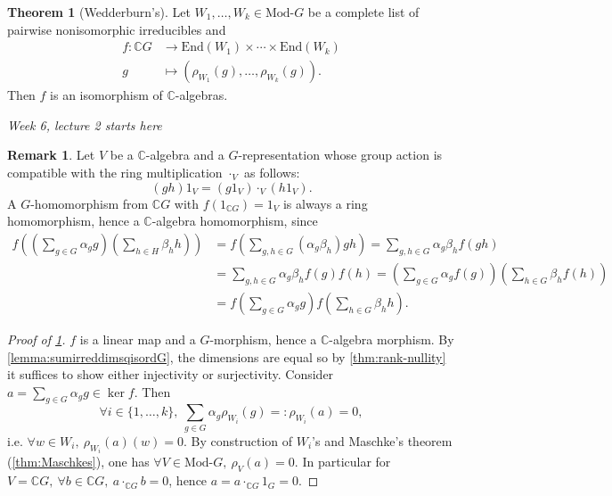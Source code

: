 \documentclass[a4paper]{article}
\newcommand{\C}{\mathbb{C}}
\newcommand{\End}{\text{End}}
\newcommand{\Mod}{\text{Mod-}}
\theoremstyle{definition}
\newtheorem{thm}[defn]{Theorem}
\newtheorem*{remark}{Remark}
\begin{document}
\begin{thm}[Wedderburn's]
\label{thm:Wedderburns}
Let $W_1,\ldots,W_k\in\Mod G$ be a complete list of pairwise nonisomorphic irreducibles and
\[
\begin{aligned}
f:\C G&\rightarrow\End(W_1)\times\cdots\times\End(W_k)\\
g&\mapsto \left(\rho_{W_1}(g),\ldots,\rho_{W_k}(g)\right).
\end{aligned}
\]
Then $f$ is an isomorphism of $\C$-algebras.
\end{thm}

\begin{flushright}
\textit{Week 6, lecture 2 starts here}
\end{flushright}

\begin{remark}
Let $V$ be a $\C$-algebra and a $G$-representation whose group action is compatible with the ring multiplication $\cdot_V$ as follows:
\[
(gh)1_V=(g1_V)\cdot_V(h1_V).
\]
A $G$-homomorphism from $\C G$ with $f(1_{\C G})=1_V$ is always a ring homomorphism, hence a $\C$-algebra homomorphism, since
\[
\begin{aligned}
f\left(\left(\sum_{g\in G}\alpha_g g\right)\left(\sum_{h\in H}\beta_h h\right)\right)&=f\left(\sum_{g,h\in G}(\alpha_g\beta_h)gh\right)=\sum_{g,h\in G}\alpha_g\beta_h f(gh)\\
&=\sum_{g,h\in G}\alpha_g\beta_h f(g)f(h)=\left(\sum_{g\in G}\alpha_g f(g)\right)\left(\sum_{h\in G}\beta_h f(h)\right)\\
&=f\left(\sum_{g\in G}\alpha_g g\right)f\left(\sum_{h\in G}\beta_h h\right).
\end{aligned}
\]
\end{remark}

\begin{proof}[Proof of \ref{thm:Wedderburns}]
$f$ is a linear map and a $G$-morphism, hence a $\C$-algebra morphism. By \ref{lemma:sumirreddimsqisordG}, the dimensions are equal so by \ref{thm:rank-nullity} it suffices to show either injectivity or surjectivity. Consider $\displaystyle a=\sum_{g\in G}\alpha_g g\in\ker f$. Then
\[
\forall i\in\{1,\ldots,k\},\ \sum_{g\in G}\alpha_g\rho_{W_i}(g)=:\rho_{W_i}(a)=0,
\]
i.e. $\forall w\in W_i,\ \rho_{W_i}(a)(w)=0$. By construction of $W_i$'s and Maschke's theorem (\ref{thm:Maschkes}), one has $\forall V\in\Mod G,\ \rho_V(a)=0$. In particular for $V=\C G,\ \forall b\in\C G,\ a\cdot_{\C G}b=0$, hence $a=a\cdot_{\C G}1_G=0$.
\end{proof}
\end{document}
